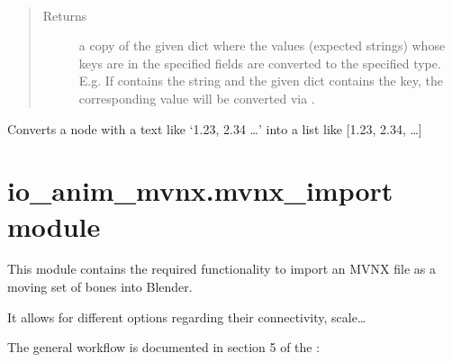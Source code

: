 \documentclass[letterpaper,10pt,english,openany,oneside]{sphinxmanual}
\begin{document}
\begin{fulllineitems}
\label{\detokenize{io_anim_mvnx:io_anim_mvnx.mvnx.process_dict}}~\begin{quote}\begin{description}
\item[{Returns}] \leavevmode
a copy of the given dict where the values (expected strings)
whose keys are in the specified fields are converted to the specified
type. E.g. If  contains the  string and the given
dict contains the  key, the corresponding value will be
converted via .

\end{description}\end{quote}

\end{fulllineitems}


\begin{fulllineitems}
\label{\detokenize{io_anim_mvnx:io_anim_mvnx.mvnx.str_to_vec}}
Converts a node with a text like ‘1.23, 2.34 …’ into a list
like {[}1.23, 2.34, …{]}

\end{fulllineitems}



\section{io\_anim\_mvnx.mvnx\_import module}
\label{\detokenize{io_anim_mvnx:module-io_anim_mvnx.mvnx_import}}\label{\detokenize{io_anim_mvnx:io-anim-mvnx-mvnx-import-module}}
This module contains the required functionality to import an MVNX file as a
moving set of bones into Blender.

It allows for different options regarding their connectivity, scale…

The general workflow is documented in section 5 of the :
\begin{quote}

\end{quote}
\end{document}
